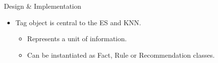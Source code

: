 \documentclass[final]{beamer} %
\begin{document}
\begin{frame}
\begin{columns}
\begin{column}{.34\textwidth}
{\begin{block}{Design \& Implementation}
					
					\begin{itemize}
						\item Tag object is central to the ES and KNN.
						\begin{itemize}
							\item Represents a unit of information.
							\item Can be instantiated as Fact, Rule or Recommendation classes.
						\end{itemize}
					\end{itemize}
				

\end{block}}
\end{column}
\end{columns}
\end{frame}
\end{document}
